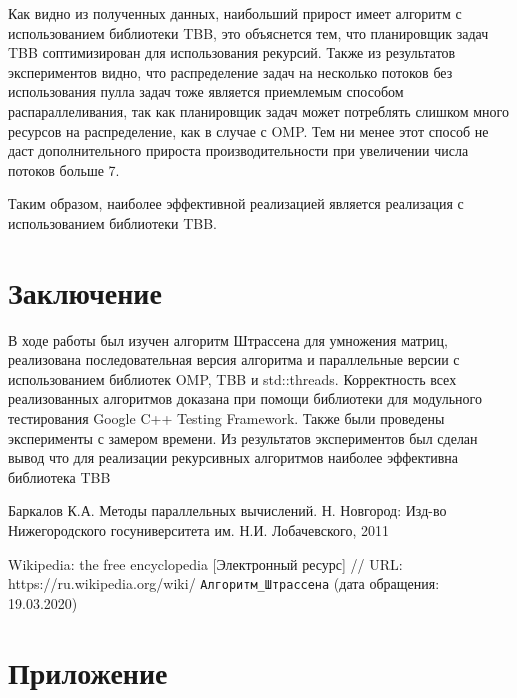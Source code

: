 \documentclass{report}
\begin{document}
 
\par Как видно из полученных данных, наибольший прирост имеет алгоритм с использованием библиотеки TBB, это объяснется тем, что планировщик задач TBB соптимизирован для использования рекурсий. Также из результатов экспериментов видно, что распределение задач на несколько потоков без использования пулла задач тоже является приемлемым способом распараллеливания, так как планировщик задач может потреблять слишком много ресурсов на распределение, как в случае с OMP. Тем ни менее этот способ не даст дополнительного прироста производительности при увеличении числа потоков больше 7. 
\par Таким образом, наиболее эффективной реализацией является реализация с использованием библиотеки TBB.
 
\newpage

\section*{Заключение}

\par В ходе работы был изучен алгоритм Штрассена для умножения матриц, реализована последовательная версия алгоритма и параллельные версии с использованием библиотек OMP, TBB и std::threads. Корректность всех реализованных алгоритмов доказана при помощи  библиотеки для модульного тестирования Google C++ Testing Framework. Также были проведены эксперименты с замером времени. Из результатов экспериментов был сделан вывод что для реализации рекурсивных алгоритмов наиболее эффективна библиотека TBB

\newpage

\begin{thebibliography}{1}

 Баркалов К.А. Методы параллельных вычислений. Н. Новгород: Изд-во Нижегородского госуниверситета им. Н.И. Лобачевского, 2011

 Wikipedia: the free encyclopedia [Электронный ресурс] // URL: https://ru.wikipedia.org/wiki/ \verb|Алгоритм_Штрассена| (дата обращения: 19.03.2020)

\end{thebibliography}
\newpage

\section*{Приложение}
\end{document}
